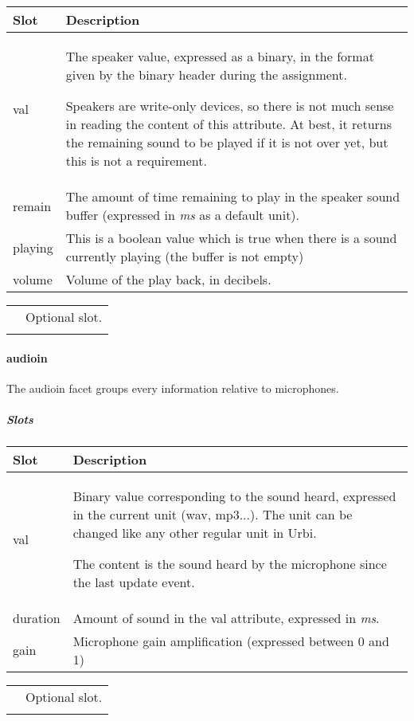 \documentclass[a4paper]{article}
\begin{document}
\begin{flushleft}
\tablehead{}
\begin{supertabular}{|m{3.293cm}|m{11.997cm}|}
\hline
\sffamily\bfseries Slot &
\sffamily\bfseries Description\\\hline
val &
 The speaker value, expressed as a
binary, in the format given by the binary header during the
assignment.

\sffamily Speakers are write-only devices, so
there is not much sense in reading the content of this attribute. At
best, it returns the remaining sound to be played if it is not over
yet, but this is not a requirement.\\\hline
remain &
The amount of time remaining to play in
the speaker sound buffer (expressed in \textit{ms} as
a default unit).\\\hline
playing &
\sffamily This is a boolean value which is true
when there is a sound currently playing (the buffer is not
empty)\\\hline
volume &
\sffamily Volume of the play back, in
decibels.\\\hline
\end{supertabular}
\end{flushleft}
\begin{flushleft}
\tablehead{}
\begin{supertabular}{|m{1.717cm}|m{10.464cm}}
\hhline{-~}
 &
Optional slot.\\\hhline{-~}
\end{supertabular}
\end{flushleft}
\paragraph{audioin}


The audioin facet groups every information relative to microphones.

\subparagraph{Slots}

\begin{flushleft}
\tablehead{}
\begin{supertabular}{|m{3.293cm}|m{11.997cm}|}
\hline
\sffamily\bfseries Slot &
\sffamily\bfseries Description\\\hline
val &
 Binary value corresponding to the
sound heard, expressed in the current unit (wav, mp3...). The unit can
be changed like any other regular unit in Urbi.

The content is the sound heard by the
microphone since the last update event.\\\hline
duration &
Amount of sound in the val
attribute, expressed in \textit{ms}.\\\hline
gain &
Microphone gain amplification
(expressed between 0 and 1)\\\hline
\end{supertabular}
\end{flushleft}
\begin{flushleft}
\tablehead{}
\begin{supertabular}{|m{1.717cm}|m{10.464cm}}
\hhline{-~}
 &
\sffamily Optional slot.\\\hhline{-~}
\end{supertabular}
\end{flushleft}
\end{document}
